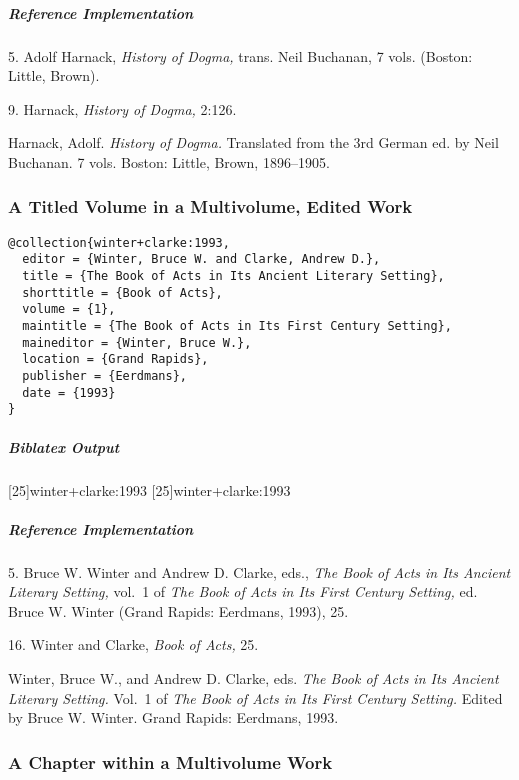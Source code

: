 \documentclass[a4paper]{article}
\newenvironment{biboutput}{%
  \subparagraph{Biblatex Output}
}{\color{black}}
\newenvironment{refimp}{%
  \subparagraph{Reference Implementation}
  \color{reference-colour}
  \rm
}{\par\color{black}}
\begin{document}
\begin{refimp}
  5. Adolf Harnack, \emph{History of Dogma,} trans. Neil Buchanan, 7 vols.
  (Boston: Little, Brown).

  9. Harnack, \emph{History of Dogma,} 2:126.

  \hangindent\bibindent Harnack, Adolf. \emph{History of Dogma.} Translated
  from the 3rd German ed. by Neil Buchanan. 7 vols. Boston: Little, Brown,
  1896–1905.
\end{refimp}

\subsubsection{A Titled Volume in a Multivolume, Edited Work}

\begin{lstlisting}
@collection{winter+clarke:1993,
  editor = {Winter, Bruce W. and Clarke, Andrew D.},
  title = {The Book of Acts in Its Ancient Literary Setting},
  shorttitle = {Book of Acts},
  volume = {1},
  maintitle = {The Book of Acts in Its First Century Setting},
  maineditor = {Winter, Bruce W.},
  location = {Grand Rapids},
  publisher = {Eerdmans},
  date = {1993}
}
\end{lstlisting}  

\begin{biboutput}
  [25]{winter+clarke:1993}
  [25]{winter+clarke:1993}
\end{biboutput}

\begin{refimp}
  5. Bruce W. Winter and Andrew D. Clarke, eds., \emph{The Book of Acts in Its
  Ancient Literary Setting,} vol.~1 of \emph{The Book of Acts in Its First
  Century Setting,} ed. Bruce W. Winter (Grand Rapids: Eerdmans, 1993), 25.

  16. Winter and Clarke, \emph{Book of Acts,} 25.

  \hangindent\bibindent Winter, Bruce W., and Andrew D. Clarke, eds. \emph{The
  Book of Acts in Its Ancient Literary Setting.} Vol.~1 of \emph{The Book of
  Acts in Its First Century Setting.} Edited by Bruce W. Winter. Grand Rapids:
  Eerdmans, 1993.
\end{refimp}

\subsubsection{A Chapter within a Multivolume Work}
\end{document}
